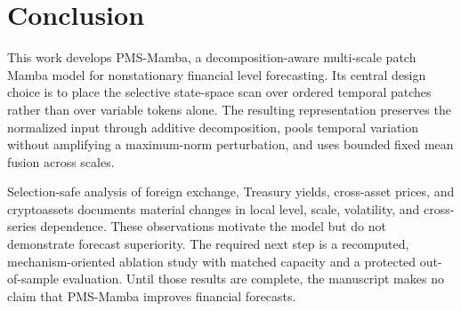 \section{Conclusion}

This work develops PMS-Mamba, a decomposition-aware multi-scale patch Mamba model for nonstationary financial level forecasting.
Its central design choice is to place the selective state-space scan over ordered temporal patches rather than over variable tokens alone.
The resulting representation preserves the normalized input through additive decomposition, pools temporal variation without amplifying a maximum-norm perturbation, and uses bounded fixed mean fusion across scales.

Selection-safe analysis of foreign exchange, Treasury yields, cross-asset prices, and cryptoassets documents material changes in local level, scale, volatility, and cross-series dependence.
These observations motivate the model but do not demonstrate forecast superiority.
The required next step is a recomputed, mechanism-oriented ablation study with matched capacity and a protected out-of-sample evaluation.
Until those results are complete, the manuscript makes no claim that PMS-Mamba improves financial forecasts.
